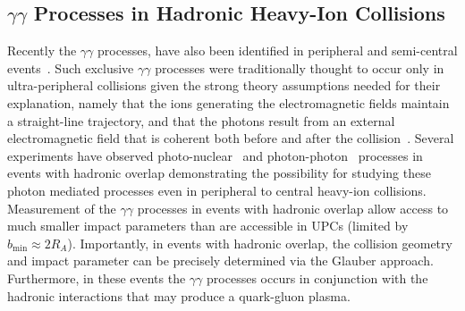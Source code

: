 \documentclass[twocolumn,epjc3]{svjour3}\sloppy
\begin{document}
\subsection{$\gamma\gamma$ Processes in Hadronic Heavy-Ion Collisions}
Recently the $\gamma\gamma$ processes, have also been identified in peripheral and semi-central events~\cite{starcollaborationLowEnsuremathPair2018b,alicecollaborationMeasurementExcessYield2016b,atlascollaborationObservationCentralityDependentAcoplanarity2018a}. 
Such exclusive $\gamma\gamma$ processes were traditionally thought to occur only in ultra-peripheral collisions given the strong theory assumptions needed for their explanation, namely that the ions generating the electromagnetic fields maintain a straight-line trajectory, and that the photons result from an external electromagnetic field that is coherent both before and after the collision~\cite{zhaCoherentEnsuremathPsi2018}.
Several experiments have observed photo-nuclear~\cite{alicecollaborationMeasurementExcessYield2016b,starcollaborationObservationExcessPsi2019} and photon-photon~\cite{starcollaborationLowEnsuremathPair2018b,atlascollaborationObservationCentralityDependentAcoplanarity2018a} processes in events with hadronic overlap demonstrating the possibility for studying these photon mediated processes even in peripheral to central heavy-ion collisions. 
Measurement of the $\gamma\gamma$ processes in events with hadronic overlap allow access to much smaller impact parameters than are accessible in UPCs (limited by $b_{\min} \approx 2R_{A} $). 
Importantly, in events with hadronic overlap, the collision geometry and impact parameter can be precisely determined via the Glauber approach\cite{millerGlauberModelingHigh2007b,alicecollaborationCentralityDeterminationPbPb2013}.
Furthermore, in these events the $\gamma\gamma$ processes occurs in conjunction with the hadronic interactions that may produce a quark-gluon plasma. 
\end{document}
